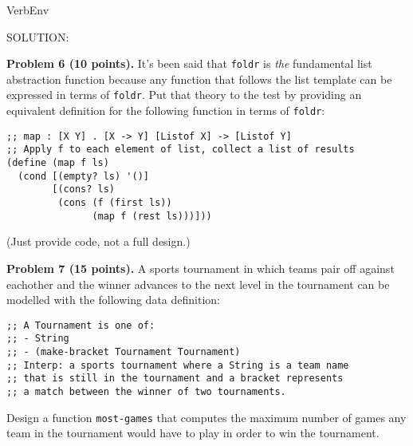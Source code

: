 \documentclass[12pt]{article}
\begin{document}
\begin{SaveVerbatim}{VerbEnv}

SOLUTION:
  
\end{SaveVerbatim}




\newpage

\noindent
{\bf Problem 6 (10 points).}
%
It's been said that {\tt foldr} is \emph{the} fundamental list
abstraction function because any function that follows the list
template can be expressed in terms of {\tt foldr}.  Put that theory to
the test by providing an equivalent definition for the following
function in terms of {\tt foldr}:

\begin{verbatim}
;; map : [X Y] . [X -> Y] [Listof X] -> [Listof Y]
;; Apply f to each element of list, collect a list of results
(define (map f ls)
  (cond [(empty? ls) '()]
        [(cons? ls)
         (cons (f (first ls))
               (map f (rest ls)))]))
\end{verbatim}

\noindent
(Just provide code, not a full design.)

\newpage

\noindent
{\bf Problem 7 (15 points).}
%
A sports tournament in which teams pair off against eachother and
the winner advances to the next level in the tournament can be modelled
with the following data definition:

\begin{verbatim}
;; A Tournament is one of:
;; - String
;; - (make-bracket Tournament Tournament)
;; Interp: a sports tournament where a String is a team name
;; that is still in the tournament and a bracket represents
;; a match between the winner of two tournaments. 
\end{verbatim}

Design a function {\tt most-games} that computes the maximum number of
games any team in the tournament would have to play in order to win
the tournament.
\end{document}
